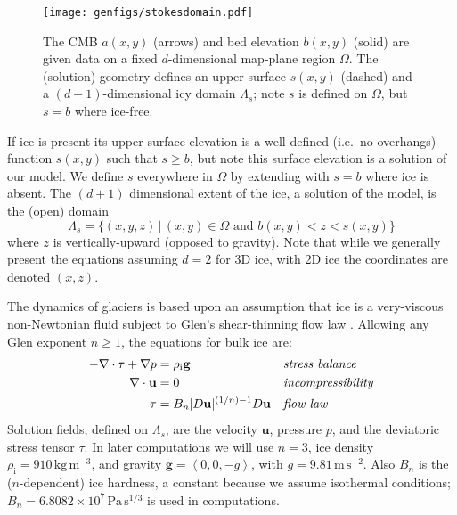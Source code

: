 \documentclass[letterpaper,final,12pt,reqno]{amsart}
\theoremstyle{claim}
\newcommand{\bg}{\mathbf{g}}
\newcommand{\bu}{\mathbf{u}}
\newcommand{\rhoi}{\rho_{\text{i}}}
\numberwithin{equation}{section}
\numberwithin{figure}{section}
\numberwithin{table}{section}
\numberwithin{theorem}{section}
\begin{document}
\begin{figure}[ht]
\begin{center}
\texttt{[image: genfigs/stokesdomain.pdf]}
\end{center}
\caption{The CMB $a(x,y)$ (arrows) and bed elevation $b(x,y)$ (solid) are given data on a fixed $d$-dimensional map-plane region $\Omega$.  The (solution) geometry defines an upper surface $s(x,y)$ (dashed) and a $(d+1)$-dimensional icy domain $\Lambda_s$; note $s$ is defined on $\Omega$, but $s=b$ where ice-free.}
\label{fig:stokesdomain}
\end{figure}

If ice is present its upper surface elevation is a well-defined (i.e.~no overhangs) function $s(x,y)$ such that $s\ge b$, but note this surface elevation is a solution of our model.  We define $s$ everywhere in $\Omega$ by extending with $s=b$ where ice is absent.  The $(d+1)$ dimensional extent of the ice, a solution of the model, is the (open) domain
\begin{equation}
\Lambda_s = \{(x,y,z)\,|\,(x,y) \in \Omega \text{ and } b(x,y) < z < s(x,y)\} \label{eq:lambdas}
\end{equation}
where $z$ is vertically-upward (opposed to gravity).  Note that while we generally present the equations assuming $d=2$ for 3D ice, with 2D ice the coordinates are denoted $(x,z)$.

The dynamics of glaciers is based upon an assumption that ice is a very-viscous non-Newtonian fluid subject to Glen's shear-thinning flow law \cite{GreveBlatter2009}.  Allowing any Glen exponent $n\ge 1$, the equations \cite[Chapter 1]{FowlerNg2021} for bulk ice are:
\begin{align}
- \nabla \cdot \tau + \nabla p &= \rhoi \bg &&\text{\emph{stress balance}} \label{eq:forcebalance} \\
\nabla \cdot \bu &= 0 &&\text{\emph{incompressibility}} \label{eq:incompressible} \\
\tau &= B_n |D\bu|^{(1/n) - 1} D\bu  &&\text{\emph{flow law}} \label{eq:viscflowlaw}
\end{align}
Solution fields, defined on $\Lambda_s$, are the velocity $\bu$, pressure $p$, and the deviatoric stress tensor $\tau$.  In later computations we will use $n=3$, ice density $\rhoi=910 \,\text{kg}\,\text{m}^{-3}$, and gravity $\bg=\left<0,0,-g\right>$, with $g=9.81\,\text{m}\,\text{s}^{-2}$.  Also $B_n$ is the ($n$-dependent) ice hardness, a constant because we assume isothermal conditions; $B_n=6.8082\times 10^7\,\text{Pa}\,\text{s}^{1/3}$ is used in computations.
\end{document}
